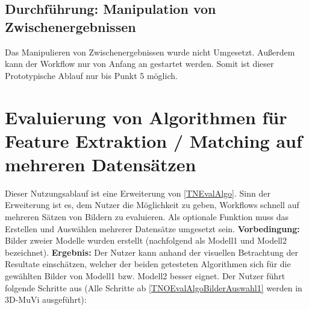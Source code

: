 \subsection{Durchführung: Manipulation von Zwischenergebnissen}
Das Manipulieren von Zwischenergebnissen wurde nicht Umgesetzt. Außerdem kann der Workflow nur von Anfang an gestartet werden. Somit ist dieser Prototypische Ablauf nur bis Punkt 5 möglich.

\section{Evaluierung von Algorithmen für Feature Extraktion / Matching auf mehreren Datensätzen}
Dieser Nutzungsablauf ist eine Erweiterung von \ref{TNEvalAlgo}. Sinn der Erweiterung ist es, dem Nutzer die Möglichkeit zu geben, Workflows schnell auf mehreren Sätzen von Bildern zu evaluieren. Als optionale Funktion muss das Erstellen und Auswählen mehrerer Datensätze umgesetzt sein.\newline
\textbf{Vorbedingung:} Bilder zweier Modelle wurden erstellt (nachfolgend als Modell1 und Modell2 bezeichnet). \newline
\textbf{Ergebnis:} Der Nutzer kann anhand der visuellen Betrachtung der Resultate einschätzen, welcher der beiden getesteten Algorithmen sich für die gewählten Bilder von Modell1 bzw. Modell2 besser eignet. \newline
Der Nutzer führt folgende Schritte aus (Alle Schritte ab \ref{TNOEvalAlgoBilderAuswahl1} werden in 3D-MuVi ausgeführt):
